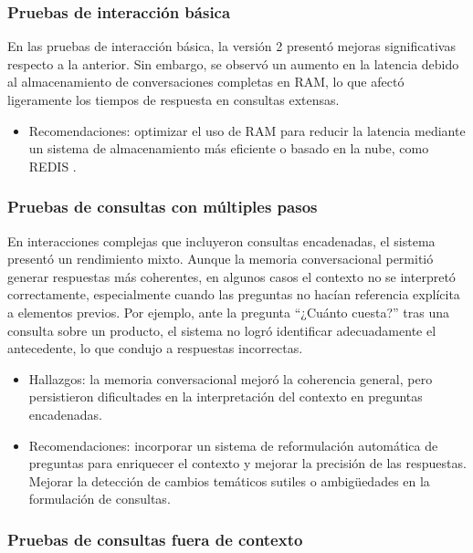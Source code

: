 \subsubsection{Pruebas de interacción básica}

En las pruebas de interacción básica, la versión 2 presentó mejoras significativas respecto a la anterior. Sin embargo, se observó un aumento en la latencia debido al almacenamiento de conversaciones completas en RAM, lo que afectó ligeramente los tiempos de respuesta en consultas extensas.

\begin{itemize}
    \item Recomendaciones: optimizar el uso de RAM para reducir la latencia mediante un sistema de almacenamiento más eficiente o basado en la nube, como REDIS \citep{REDIS}.
\end{itemize}

\subsubsection{Pruebas de consultas con múltiples pasos}

En interacciones complejas que incluyeron consultas encadenadas, el sistema presentó un rendimiento mixto. Aunque la memoria conversacional permitió generar respuestas más coherentes, en algunos casos el contexto no se interpretó correctamente, especialmente cuando las preguntas no hacían referencia explícita a elementos previos. Por ejemplo, ante la pregunta ``¿Cuánto cuesta?'' tras una consulta sobre un producto, el sistema no logró identificar adecuadamente el antecedente, lo que condujo a respuestas incorrectas.

\begin{itemize}
    \item Hallazgos: la memoria conversacional mejoró la coherencia general, pero persistieron dificultades en la interpretación del contexto en preguntas encadenadas.
    \item Recomendaciones: incorporar un sistema de reformulación automática de preguntas para enriquecer el contexto y mejorar la precisión de las respuestas. Mejorar la detección de cambios temáticos sutiles o ambigüedades en la formulación de consultas.
\end{itemize}

\subsubsection{Pruebas de consultas fuera de contexto}

